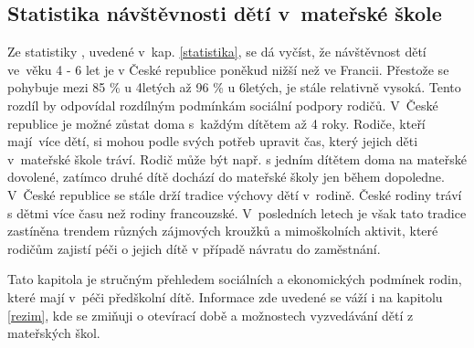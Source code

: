 			\subsection{Statistika návštěvnosti dětí v mateřské škole}
		
				Ze statistiky \cite{Eurydice}, uvedené v kap. \ref{statistika}, se dá vyčíst, že návštěvnost dětí ve věku 4 - 6 let je v České republice poněkud nižší než ve Francii. Přestože se pohybuje mezi 85 \% u 4letých až 96 \% u 6letých, je stále relativně vysoká. Tento rozdíl by odpovídal rozdílným podmínkám sociální podpory rodičů. V České republice je možné zůstat doma s každým dítětem až 4 roky. Rodiče, kteří mají více dětí, si mohou podle svých potřeb upravit čas, který jejich děti v mateřské škole tráví. Rodič může být např. s jedním dítětem doma na mateřské dovolené, zatímco druhé dítě dochází do mateřské školy jen během dopoledne. V České republice se stále drží tradice výchovy dětí v rodině. České rodiny tráví s dětmi více času než rodiny francouzské. V posledních letech je však tato tradice zastíněna trendem různých zájmových kroužků a mimoškolních aktivit, které rodičům zajistí péči o jejich dítě v případě návratu do zaměstnání.  


				
	Tato kapitola je stručným přehledem sociálních a ekonomických podmínek rodin, které mají v péči předškolní dítě. Informace zde uvedené se váží i na kapitolu \ref{rezim}, kde se zmiňuji o otevírací době a možnostech vyzvedávání dětí z mateřských škol.

